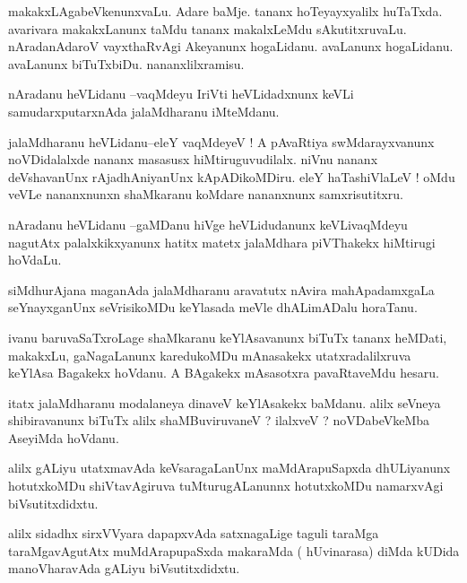 \documentclass{article}
\begin{document}
\begin{mn}%
makakxLAgabeVkenunxvaLu. Adare baMje. tananx hoTeyayxyalilx huTaTxda. avarivara makakxLanunx 
taMdu tananx makalxLeMdu sAkutitxruvaLu. nAradanAdaroV vayxthaRvAgi Akeyanunx hogaLidanu. 
avaLanunx hogaLidanu. avaLanunx biTuTxbiDu. nananxlilxramisu.
\end{mn}

\begin{mn}%
nAradanu heVLidanu --vaqMdeyu IriVti heVLidadxnunx keVLi samudarxputarxnAda jalaMdharanu 
iMteMdanu.
\end{mn}

\begin{mn}%
jalaMdharanu heVLidanu--eleY vaqMdeyeV ! A pAvaRtiya swMdarayxvanunx noVDidalalxde nananx  
masasusx hiMtiruguvudilalx. niVnu nananx deVshavanUnx rAjadhAniyanUnx kApADikoMDiru. eleY 
haTashiVlaLeV ! oMdu veVLe nananxnunxn shaMkaranu koMdare nananxnunx samxrisutitxru.
\end{mn}

\begin{mn}%
nAradanu heVLidanu --gaMDanu hiVge heVLidudanunx keVLivaqMdeyu nagutAtx palalxkikxyanunx 
hatitx matetx jalaMdhara piVThakekx hiMtirugi hoVdaLu.
\end{mn}

\begin{mn}%
siMdhurAjana maganAda jalaMdharanu aravatutx nAvira mahApadamxgaLa seYnayxganUnx 
seVrisikoMDu keYlasada meVle dhALimADalu horaTanu.
\end{mn}

\begin{mn}%
ivanu baruvaSaTxroLage shaMkaranu keYlAsavanunx biTuTx tananx heMDati, makakxLu, 
gaNagaLanunx karedukoMDu mAnasakekx utatxradalilxruva keYlAsa Bagakekx hoVdanu. A BAgakekx 
mAsasotxra pavaRtaveMdu hesaru.
\end{mn}

\begin{mn}%
itatx jalaMdharanu modalaneya dinaveV keYlAsakekx baMdanu. alilx seVneya shibiravanunx 
biTuTx alilx shaMBuviruvaneV ? ilalxveV ? noVDabeVkeMba AseyiMda hoVdanu.
\end{mn}

\begin{mn}%
alilx gALiyu utatxmavAda keVsaragaLanUnx maMdArapuSapxda dhULiyanunx hotutxkoMDu 
shiVtavAgiruva tuMturugALanunnx hotutxkoMDu namarxvAgi biVsutitxdidxtu.
\end{mn}

\begin{mn}%
alilx sidadhx sirxVVyara dapapxvAda satxnagaLige taguli taraMga taraMgavAgutAtx 
muMdArapupaSxda makaraMda ( hUvinarasa) diMda kUDida manoVharavAda gALiyu biVsutitxdidxtu.
\end{mn}
\end{document}
